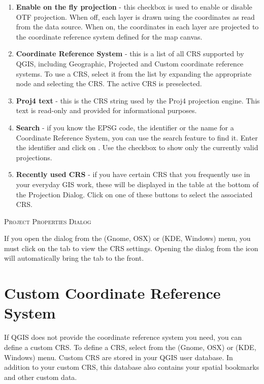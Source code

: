 \begin{enumerate}
\item \textbf{Enable on the fly projection} -
this checkbox is used to enable or disable OTF projection. When off, each
layer is drawn using the coordinates as read from the data source. When on,
the coordinates in each layer are projected to the coordinate reference
system defined for the map canvas.
\item \textbf{Coordinate Reference System} - this is a list of all CRS
supported by QGIS, including Geographic, Projected and Custom coordinate
reference systems. To use a CRS, select it from the list by expanding
the appropriate node and selecting the CRS. The active CRS is preselected.
\item \textbf{Proj4 text} - this is the CRS string used by the Proj4
projection engine. This text is read-only and provided for informational
purposes.
\item \textbf{Search} - if you know the EPSG code, the identifier or the name
for a Coordinate Reference System, you can use the search feature to find it.
Enter the identifier and click on . Use the  checkbox to show only the currently valid projections.
\item \textbf{Recently used CRS} - if you have certain CRS that you frequently
use in your everyday GIS work, these will be displayed in the table
at the bottom of the Projection Dialog. Click on one of these buttons to select
the associated CRS.
\end{enumerate}

\begin{Tip}
\caption{\textsc{Project Properties Dialog}}
If you open the  dialog from the
 (Gnome, OSX) or 
(KDE, Windows) menu, you must click on the  tab to view the CRS settings. Opening the dialog from the
 icon will automatically bring
the  tab to the front.
\end{Tip}

\section{Custom Coordinate Reference System}\label{sec:customprojections}

If QGIS does not provide the coordinate reference system you need, you
can define a custom CRS. To define a CRS, select
 from the 
(Gnome, OSX) or  (KDE, Windows) menu.
Custom CRS are stored in your QGIS user database. In addition to your custom
CRS, this database also contains your spatial bookmarks and other custom data.

